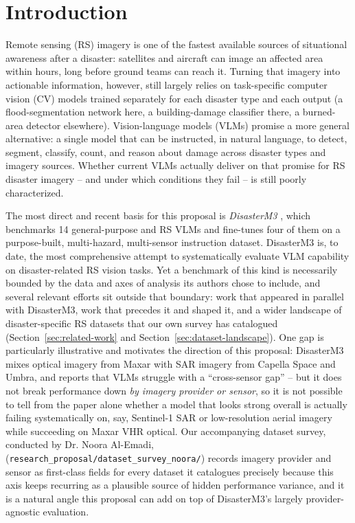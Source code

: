 \section{Introduction}
\label{sec:research-introduction}

Remote sensing (RS) imagery is one of the fastest available sources of situational
awareness after a disaster: satellites and aircraft can image an affected area
within hours, long before ground teams can reach it. Turning that imagery into
actionable information, however, still largely relies on task-specific computer
vision (CV) models trained separately for each disaster type and each output
(a flood-segmentation network here, a building-damage classifier there, a
burned-area detector elsewhere). Vision-language models (VLMs) promise a more
general alternative: a single model that can be instructed, in natural
language, to detect, segment, classify, count, and reason about damage across
disaster types and imagery sources. Whether current VLMs actually deliver on
that promise for RS disaster imagery -- and under which conditions they fail
-- is still poorly characterized.

The most direct and recent basis for this proposal is \emph{DisasterM3}
, which benchmarks 14 general-purpose and RS VLMs
and fine-tunes four of them on a purpose-built, multi-hazard, multi-sensor
instruction dataset. DisasterM3 is, to date, the most comprehensive attempt
to systematically evaluate VLM capability on disaster-related RS vision
tasks. Yet a benchmark of this kind is necessarily bounded by the data and
axes of analysis its authors chose to include, and several relevant efforts
sit outside that boundary: work that appeared in parallel with DisasterM3,
work that precedes it and shaped it, and a wider landscape of
disaster-specific RS datasets that our own survey has catalogued
(Section~\ref{sec:related-work} and Section~\ref{sec:dataset-landscape}).
One gap is particularly
illustrative and motivates the direction of this proposal: DisasterM3 mixes
optical imagery from Maxar with SAR imagery from Capella Space and Umbra, and
reports that VLMs struggle with a ``cross-sensor gap'' -- but it does not
break performance down \emph{by imagery provider or sensor}, so it is not
possible to tell from the paper alone whether a model that looks strong
overall is actually failing systematically on, say, Sentinel-1 SAR or
low-resolution aerial imagery while succeeding on Maxar VHR optical. Our
accompanying dataset survey, conducted by Dr. Noora Al-Emadi, (\texttt{research\_proposal/dataset\_survey\_noora/}) records
imagery provider and sensor as first-class fields for every dataset it
catalogues precisely because this axis keeps recurring as a plausible source
of hidden performance variance, and it is a natural angle this proposal can
add on top of DisasterM3's largely provider-agnostic evaluation.

